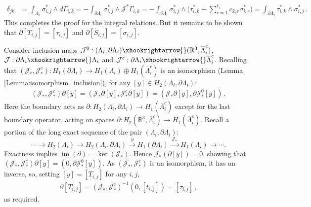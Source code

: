 \documentclass[11pt]{article}
\theoremstyle{plain}
\theoremstyle{definition}
\theoremstyle{remark}
\newcommand{\R}{\mathbb{R}}
\newcommand{\ST}{\Lambda}
\begin{document}
\begin{align*}
    \delta_{jk} &= \int_{ \ST_i} \sigma_{i,j}^* \wedge d \Gamma_{i,k} 
    = - \int_{\partial \ST_i} \sigma_{i,j}^* \wedge \mathcal{J}^*\Gamma_{i,k}
    = - \int_{\partial \ST_i} \sigma_{i,j}^* \wedge \Big( \tau_{i,k}^* + \sum_{r=1}^{\ell_i} c_{k,r} \sigma_{i,r}^* \Big)
    =  \int_{\partial \ST_i}  \tau_{i,k}^*  \wedge \sigma_{i,j}^*
    \, .
\end{align*}
This completes the proof for the integral relations. But it remains to be shown that \(\partial [T_{i,j}] = [\tau_{i,j}]\) and \(\partial [S_{i,j}] = [\sigma_{i,j}]\). 

Consider inclusion maps \(\mathcal{J}^0 : (\ST_i, \partial \ST_i) \xhookrightarrow{} (\R^3 , \overline{\ST}_i^c)\), \(\mathcal{J} :  \partial \ST_i \xhookrightarrow{}  \ST_i\) and \( \mathcal{J}^c : \partial \ST_i \xhookrightarrow{} \overline{ \ST }_i^c \). Recalling that \((\mathcal{J}_*, \mathcal{J}^c_*) : H_1(\partial \ST_i) \to H_1(\ST_i) \oplus H_1(\overline{\ST}^c_i)\) is an isomorphism (Lemma \ref{Lemma:isomorphism_inclusion}), for any \([y] \in H_2(\ST_i, \partial \ST_i)\):
\begin{align*}
    (\mathcal{J}_*, \mathcal{J}^c_*) \partial [y] = ( \mathcal{J}_*  \partial [y], \mathcal{J}^c_*  \partial [y]) 
    =  ( \mathcal{J}_*  \partial [y],   \partial \mathcal{J}^0_* [y])  \, . 
\end{align*}
Here the boundary acts as \(\partial : H_2(\ST_i, \partial \ST_i) \to H_{1}(\overline{\ST}_i^c)\) except for the last boundary operator, acting on spaces \(\partial : H_2(\R^3 , \overline{\ST}_i^c) \to H_{1}(\overline{\ST}_i^c)\). Recall a portion of the long exact sequence of the pair \((\ST_i,\partial\ST_i)\):
\[
\cdots \longrightarrow H_2(\ST_i) \longrightarrow H_2(\ST_i,\partial\ST_i)
\xrightarrow{\; \partial \;} H_1(\partial\ST_i)
\xrightarrow{\;\mathcal{J}_*\;} H_1(\ST_i)\longrightarrow\cdots .
\]
Exactness implies \(\operatorname{im}(\partial ) = \ker( \mathcal{J}_* )\). Hence \(\mathcal{J}_*(\partial [y])=0\),
showing that \((\mathcal{J}_*, \mathcal{J}^c_*)  \partial [y]  =  ( 0,   \partial \mathcal{J}^0_* [y])\). As \((\mathcal{J}_*, \mathcal{J}^c_*) \) is an isomorphism, it has an inverse, so, setting \([y] = [T_{i,j}]\) for any \(i,j\),
\begin{align*}
    \partial [T_{i,j}]  = (\mathcal{J}_*, \mathcal{J}^c_*)^{-1} ( 0, [t_{i,j}]) = [\tau_{i,j}] \, ,
\end{align*}
as required. 
\end{document}
